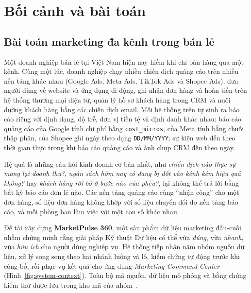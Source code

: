 \setcounter{page}{1}

\section{Bối cảnh và bài toán}
\label{sec:c1-boi-canh}

\subsection{Bài toán marketing đa kênh trong bán lẻ}
\label{sec:c1-bai-toan}

Một doanh nghiệp bán lẻ tại Việt Nam hiện nay hiếm khi chỉ bán hàng qua một kênh. Cùng một lúc, doanh nghiệp chạy nhiều chiến dịch quảng cáo trên nhiều nền tảng khác nhau (Google Ads, Meta Ads, TikTok Ads và Shopee Ads), đưa người dùng về website và ứng dụng di động, ghi nhận đơn hàng và hoàn tiền trên hệ thống thương mại điện tử, quản lý hồ sơ khách hàng trong CRM và nuôi dưỡng khách hàng bằng các chiến dịch email. Mỗi hệ thống trên tự sinh ra báo cáo riêng với định dạng, độ trễ, đơn vị tiền tệ và định danh khác nhau: báo cáo quảng cáo của Google tính chi phí bằng \texttt{cost\_micros}, của Meta tính bằng chuỗi thập phân, của Shopee ghi ngày theo dạng \texttt{DD/MM/YYYY}; sự kiện web đến theo thời gian thực trong khi báo cáo quảng cáo và ảnh chụp CRM đến theo ngày.

Hệ quả là những câu hỏi kinh doanh cơ bản nhất, như \emph{chiến dịch nào thực sự mang lại doanh thu?}, \emph{ngân sách hôm nay có đang bị đốt vào kênh kém hiệu quả không?} hay \emph{khách hàng rời bỏ ở bước nào của phễu?}, lại không thể trả lời bằng bất kỳ báo cáo đơn lẻ nào. Các nền tảng quảng cáo cùng ``nhận công'' cho một đơn hàng, số liệu đơn hàng không khớp với số liệu chuyển đổi do nền tảng báo cáo, và mỗi phòng ban làm việc với một con số khác nhau.

Đề tài xây dựng \textbf{MarketPulse 360}, một sản phẩm dữ liệu marketing đầu-cuối nhằm chứng minh rằng giải pháp Kỹ thuật Dữ liệu có thể vừa \emph{đúng}, vừa \emph{nhanh}, vừa \emph{hữu ích} cho người dùng nghiệp vụ. Hệ thống tiếp nhận năm nhóm nguồn dữ liệu, xử lý song song theo hai nhánh luồng và lô, kiểm chứng tự động trước khi công bố, rồi phục vụ kết quả cho ứng dụng \emph{Marketing Command Center} (Hình~\ref{fig:system-context}). Toàn bộ mã nguồn, dữ liệu mô phỏng và bằng chứng kiểm thử được lưu trong kho mã của nhóm~\cite{mp360repo}.


